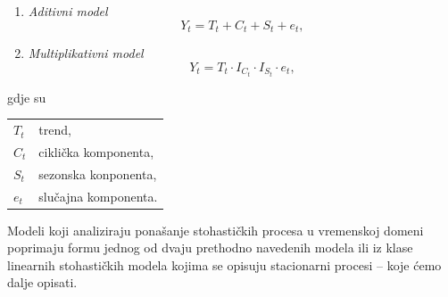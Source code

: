 \documentclass[a4paper,12pt,oneside]{memoir}
\begin{document}
            \begin{enumerate}
                \item \textit{Aditivni model} \\

                    \begin{equation}
                        Y_t=T_t+C_t+S_t+e_t,
                    \end{equation}

                \item \textit{Multiplikativni model} \\
                
                    \begin{equation}
                        Y_t=T_t\cdot I_{C_t}\cdot I_{S_t}\cdot e_t,
                    \end{equation}

            \end{enumerate}

            gdje su

            \begin{table}[H]
                \centering
                \begin{tabular*}{0.9\textwidth}{l p{13cm}}
                    \textit{$T_t$} & trend\footnotemark ,\\
                    \textit{$C_t$} & ciklička komponenta\footnotemark ,\\
                    \textit{$S_t$} & sezonska konponenta\footnotemark ,\\
                    \textit{$e_t$} & slučajna komponenta\footnotemark .
                \end{tabular*}
            \end{table}

            
            Modeli koji analiziraju ponašanje stohastičkih procesa u vremenskoj domeni poprimaju formu jednog od dvaju prethodno navedenih modela ili iz klase linearnih stohastičkih modela kojima se opisuju stacionarni procesi -- koje ćemo dalje opisati.
\end{document}

